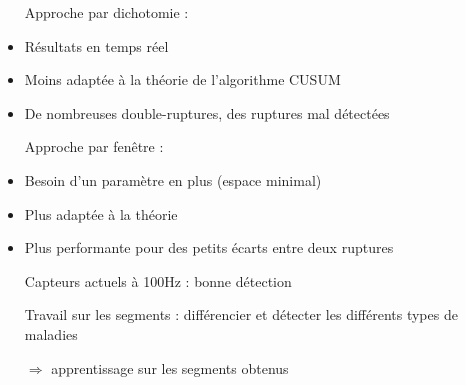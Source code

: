 \documentclass{beamer}
\begin{document}
\begin{frame}

\begin{itemize}

	\item[Approche] par dichotomie :
	\item Résultats en temps réel
	\item Moins adaptée à la théorie de l'algorithme CUSUM
	\item De nombreuses double-ruptures, des ruptures mal détectées
	\vspace{.5cm}
	\item[Approche] par fenêtre :
	\item Besoin d'un paramètre en plus (espace minimal)
	\item Plus adaptée à la théorie
	\item Plus performante pour des petits écarts entre deux ruptures
	\vspace{1cm}
	\item[Capteurs] actuels à 100Hz : bonne détection
	\vspace{.5cm}
	\item[Travail] sur les segments : différencier et détecter les différents types de maladies
	\item[$\Longrightarrow$] apprentissage sur les segments obtenus
	\vspace*{1cm}

\end{itemize}

\end{frame}
\end{document}
